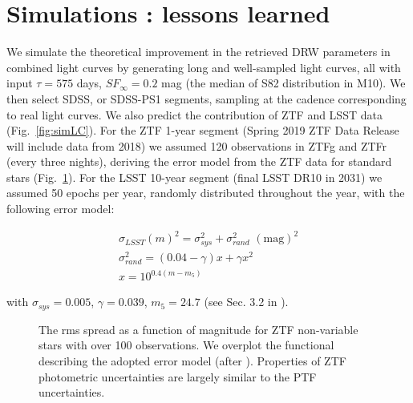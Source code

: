 \documentclass[twocolumn]{aastex62}
\begin{document}
%
%
%
%
%

\section{Simulations : lessons learned}\label{sec:simulation}

We simulate the theoretical improvement in the retrieved DRW parameters in combined light curves by generating long and well-sampled light curves, all with input $\tau = 575 $ days, $SF_{\infty} = 0.2$ mag (the median of S82 distribution in M10). We then select SDSS, or SDSS-PS1 segments, sampling at the cadence corresponding to real light curves. We also predict the contribution of ZTF and LSST data (Fig.~\ref{fig:simLC}). For the ZTF 1-year segment (Spring 2019 ZTF Data Release will include data from 2018) we assumed 120 observations in ZTFg and ZTFr (every three nights), deriving the error model from the ZTF data for standard stars (Fig.~\ref{fig:ztf_errors}). For the LSST 10-year segment (final LSST DR10 in 2031) we assumed 50 epochs per year, randomly distributed throughout the year, with the following error model:

\begin{eqnarray}
\sigma_{LSST}(m)^{2} = \sigma_{sys}^{2} + \sigma_{rand}^{2} \,\, \mathrm{(mag)}^{2}\\
\sigma_{rand}^{2} = (0.04-\gamma)x + \gamma x^{2} \\
x = 10^{0.4(m-m_{5})}
\end{eqnarray}

with  $\sigma_{sys} = 0.005$, $\gamma=0.039$, $m_{5} = 24.7$ (see Sec. 3.2 in \citet{ivezic2019}).

\begin{figure*}%
\caption{Simulated DRW process sampled at the real cadence of SDSS, PS1 segments for quasar SDSSdbID=1072282,  adding the simulated LSST segment. The well-sampled true DRW signal was first sampled at SDSS-PS1-LSST cadences, and then Gaussian offset was added to each point to simulate observational noise. }
\label{fig:simLC}
\end{figure*} 

\begin{figure}%
\caption{The rms spread as a function of magnitude for ZTF non-variable stars with over 100 observations. We overplot the functional describing the adopted error model (after \citealt{ivezic2019}). Properties of ZTF photometric uncertainties are largely similar to the PTF uncertainties.}
\label{fig:ztf_errors}
\end{figure} 
\end{document}

